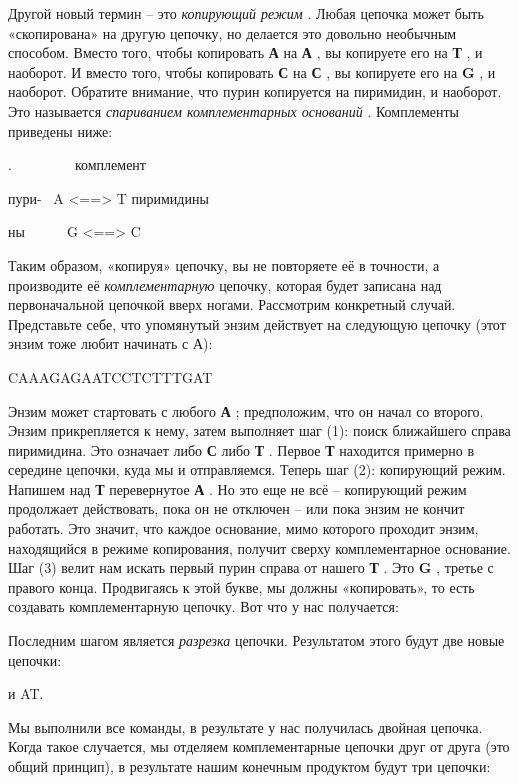 \documentclass[../main.tex]{subfiles}
\begin{document}
Другой новый термин \--- это \emph{копирующий режим} . Любая цепочка может быть «скопирована» на другую цепочку, но делается это довольно необычным способом. Вместо того, чтобы копировать \textbf{А} на \textbf{А} , вы копируете его на \textbf{Т} , и наоборот. И вместо того, чтобы копировать \textbf{С} на \textbf{С} , вы копируете его на \textbf{G} , и наоборот. Обратите внимание, что пурин копируется на пиримидин, и наоборот. Это называется \emph{спариванием комплементарных оснований} . Комплементы приведены ниже:

.~~~~~~~~~комплемент

пури- \textbar{} ~A \textless==\textgreater{} T \textbar пиримидины

ны~~~~~\textbar~G \textless==\textgreater{} C \textbar{}

Таким образом, «копируя» цепочку, вы не повторяете её в точности, а производите её \emph{комплементарную} цепочку, которая будет записана над первоначальной цепочкой вверх ногами. Рассмотрим конкретный случай. Представьте себе, что упомянутый энзим действует на следующую цепочку (этот энзим тоже любит начинать с А):

CAAAGAGAATCCTCTTTGAT

Энзим может стартовать с любого \textbf{А} ; предположим, что он начал со второго. Энзим прикрепляется к нему, затем выполняет шаг (1): поиск ближайшего справа пиримидина. Это означает либо \textbf{С} либо \textbf{Т} . Первое \textbf{Т} находится примерно в середине цепочки, куда мы и отправляемся. Теперь шаг (2): копирующий режим. Напишем над \textbf{Т} перевернутое \textbf{А} . Но это еще не всё \--- копирующий режим продолжает действовать, пока он не отключен \--- или пока энзим не кончит работать. Это значит, что каждое основание, мимо которого проходит энзим, находящийся в режиме копирования, получит сверху комплементарное основание. Шаг (3) велит нам искать первый пурин справа от нашего \textbf{Т} . Это \textbf{G} , третье с правого конца. Продвигаясь к этой букве, мы должны «копировать», то есть создавать комплементарную цепочку. Вот что у нас получается:

Последним шагом является \emph{разрезка} цепочки. Результатом этого будут две новые цепочки:

и AT.

Мы выполнили все команды, в результате у нас получилась двойная цепочка. Когда такое случается, мы отделяем комплементарные цепочки друг от друга (это общий принцип), в результате нашим конечным продуктом будут три цепочки:
\end{document}
